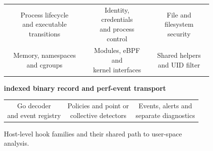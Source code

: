 \begin{figure}[ht]
    \centering
    \renewcommand{\arraystretch}{1.2}

    \begin{tabular}{ccc}
        \flowbox{Process lifecycle\\and executable transitions} &
        \flowbox{Identity, credentials\\and process control} &
        \flowbox{File and filesystem\\security} \\
        \flowbox{Memory, namespaces\\and cgroups} &
        \flowbox{Modules, eBPF and\\kernel interfaces} &
        \flowbox{Shared helpers\\and UID filter}
    \end{tabular}

    \vspace{0.55em}
    \textbf{indexed binary record and perf-event transport}
    \vspace{0.55em}

    \begin{tabular}{ccc}
        \flowbox{Go decoder\\and event registry} &
        \flowbox{Policies and point or\\collective detectors} &
        \flowbox{Events, alerts and\\separate diagnostics}
    \end{tabular}

    \caption{Host-level hook families and their shared path to user-space analysis.}
    \label{fig:summary-host-hook-families}
\end{figure}
